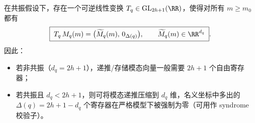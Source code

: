 \begin{corollary}\label{cor:pom-resonance-register-savings}
在共振假设下，存在一个可逆线性变换 \(T_q\in\mathrm{GL}_{2h+1}(\RR)\)，使得对所有 \(m\ge m_0\) 都有
\[
\boxed{\;
T_q\,M_q(m)=\bigl(\widetilde M_q(m),\,0_{\Delta(q)}\bigr),\qquad
\widetilde M_q(m)\in\RR^{d_q}\; }.
\]
因此：
\begin{itemize}
  \item 若非共振（\(d_q=2h+1\)），递推/存储模态向量一般需要 \(2h+1\) 个自由寄存器；
  \item 若共振且 \(d_q<2h+1\)，则可将模态递推压缩到 \(d_q\) 维，名义坐标中多出的 \(\Delta(q)=2h+1-d_q\) 个寄存器在严格模型下被强制为零（可用作 syndrome 校验子）。
\end{itemize}
\end{corollary}

